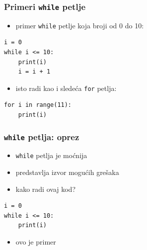 \documentclass[utf8,compress]{beamer}
\begin{document}
\begin{frame}[fragile]
  \frametitle{Primeri \texttt{while} petlje}
\begin{itemize}
  \item primer \texttt{while} petlje koja broji od 0 do 10:
\end{itemize}
\begin{verbatim}
i = 0
while i <= 10:
    print(i)
    i = i + 1
\end{verbatim}
\begin{itemize}
  \item isto radi kao i sledeća \texttt{for} petlja:
\end{itemize}
\begin{verbatim}
for i in range(11):
    print(i)
\end{verbatim}
\end{frame}


\begin{frame}[fragile]
  \frametitle{\texttt{while} petlja: oprez}
  \begin{itemize}
    \item \texttt{while} petlja je moćnija
    \item predstavlja izvor mogućih grešaka
    \item kako radi ovaj kod?
  \end{itemize}
\begin{verbatim}
i = 0
while i <= 10:
    print(i)
\end{verbatim}
  \begin{itemize}
    \item<2> ovo je primer 
  \end{itemize}
\end{frame}

\end{document}
